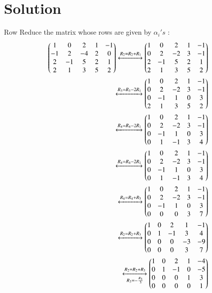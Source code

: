 \documentclass[journal,12pt,twocolumn]{IEEEtran}
\begin{document}
\section{\textbf{Solution}}
Row Reduce the matrix whose rows are given by $\alpha_i's$ :
\begin{align}
    \begin{pmatrix}1 & 0 & 2 & 1 & -1 \\
           -1 & 2 & -4 & 2 & 0 \\
           2 & -1 & 5 & 2 & 1 \\
           2 & 1 & 3 & 5 & 2\end{pmatrix} 
           \xleftrightarrow{R_2 = R_2+R_1}
           \begin{pmatrix}1 & 0 & 2 & 1 & -1 \\
           0 & 2 & -2 & 3 & -1 \\
           2 & -1 & 5 & 2 & 1 \\
           2 & 1 & 3 & 5 & 2\end{pmatrix}\\
           \xleftrightarrow{R_3 = R_3-2R_1}
            \begin{pmatrix}1 & 0 & 2 & 1 & -1 \\
            0 & 2 & -2 & 3 & -1 \\
            0 & -1 & 1 & 0 & 3 \\
            2 & 1 & 3 & 5 & 2\end{pmatrix}\\ 
            \xleftrightarrow{R_4 = R_4-2R_1}
            \begin{pmatrix}1 & 0 & 2 & 1 & -1 \\
            0 & 2 & -2 & 3 & -1 \\
            0 & -1 & 1 & 0 & 3 \\
            0 & 1 & -1 & 3 & 4\end{pmatrix}\\
            \xleftrightarrow{R_4 = R_4-2R_1}
            \begin{pmatrix}1 & 0 & 2 & 1 & -1 \\
            0 & 2 & -2 & 3 & -1 \\
            0 & -1 & 1 & 0 & 3 \\
            0 & 1 & -1 & 3 & 4\end{pmatrix}\\
            \xleftrightarrow{R_4 = R_4+R_3}
            \begin{pmatrix}1 & 0 & 2 & 1 & -1 \\
            0 & 2 & -2 & 3 & -1 \\
            0 & -1 & 1 & 0 & 3 \\
            0 & 0 & 0 & 3 & 7\end{pmatrix}\\
            \xleftrightarrow{R_2 = R_2+R_3}
            \begin{pmatrix}1 & 0 & 2 & 1 & -1 \\
            0 & 1 & -1 & 3 & 4 \\
            0 & 0 & 0 & -3 & -9 \\
            0 & 0 & 0 & 3 & 7\end{pmatrix}\\
            \xleftrightarrow[R_3 = -\frac{R_3}{3}]{R_2 = R_2+R_3}
            \begin{pmatrix}1 & 0 & 2 & 1 & -4 \\
            0 & 1 & -1 & 0 & -5 \\
            0 & 0 & 0 & 1 & 3 \\
            0 & 0 & 0 & 0 & 1\end{pmatrix}
\end{align}
\end{document}
